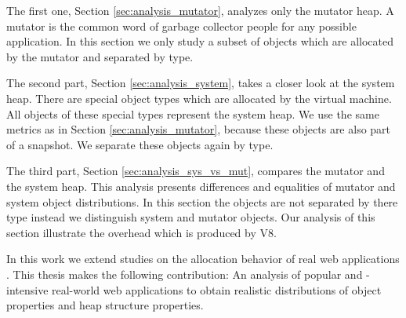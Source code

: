 The first one, Section \ref{sec:analysis_mutator}, analyzes only the mutator
heap. A mutator is the common word of garbage collector people for any possible
application. In this section we only study a subset of objects which are
allocated by the mutator and separated by type.

The second part, Section \ref{sec:analysis_system}, takes a closer look at the
system heap. There are special object types which are allocated by the virtual
machine. All objects of these special types represent the system heap. We use the same metrics as in Section \ref{sec:analysis_mutator}, because these objects are also part of a snapshot. We separate these objects again by type.

The third part, Section \ref{sec:analysis_sys_vs_mut}, compares the mutator and
the system heap. This analysis presents differences and equalities of mutator
and system object distributions. In this section the objects are not separated
by there type instead we distinguish system and mutator objects. Our analysis
of this section illustrate the overhead which is produced by V8.

In this work we extend studies on the allocation behavior of real \JS web
applications \cite{JSMeter2009}. This thesis makes the following contribution:
An analysis of popular and \JS-intensive real-world web applications to obtain
realistic distributions of object properties and heap structure properties.

